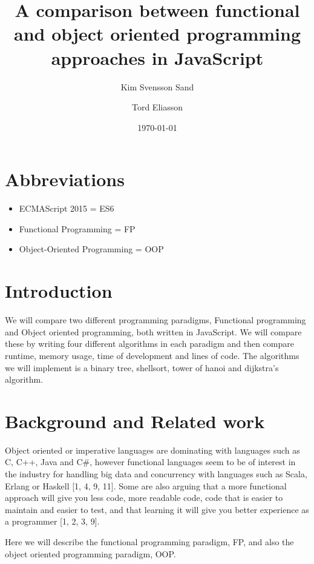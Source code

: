 \documentclass {article}
\title{A comparison between functional and object oriented programming approaches in JavaScript}
\date{\today}
\author{
Kim Svensson Sand \and Tord Eliasson
}
\begin{document}
\maketitle
{}
\newpage
\tableofcontents
\newpage
{}
\section{Abbreviations}
\begin{itemize}[leftmargin=*]
\item [ ] ECMAScript 2015 = ES6
\item [ ] Functional Programming = FP
\item [ ] Object-Oriented Programming = OOP
\end{itemize}

\section{Introduction}
We will compare two different programming paradigms, Functional programming and Object oriented programming, both written in JavaScript. We will compare these by writing four different algorithms in each paradigm and then compare runtime, memory usage, time of development and lines of code. The algorithms we will implement is a binary tree, shellsort, tower of hanoi and dijkstra's algorithm.
\section{Background and Related work}
Object oriented or imperative languages are dominating with languages such as C, C++, Java and C\#, however functional languages seem to be of interest in the industry for handling big data and concurrency with languages such as Scala, Erlang or Haskell [1, 4, 9, 11]. Some are also arguing that a more functional approach will give you less code, more readable code, code that is easier to maintain and easier to test, and that learning it will give you better experience as a programmer [1, 2, 3, 9].

Here we will describe the functional programming paradigm, FP, and also the object oriented programming paradigm, OOP. 
\end{document}
